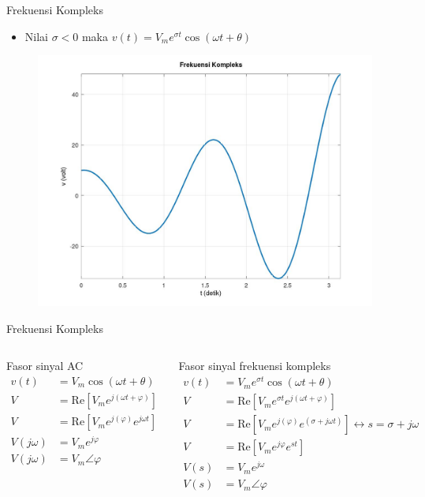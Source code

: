\documentclass[10pt]{beamer}
\begin{document}
\begin{frame}{Frekuensi Kompleks}
    \begin{itemize}
        \item Nilai $\sigma < 0$ maka $v(t) = V_m e^{\sigma t} \cos(\omega t + \theta) $
    \end{itemize}
    \begin{figure}
        \includegraphics[width=0.8\linewidth]{gambar6.jpg}
    \end{figure}
\end{frame}

\begin{frame}{Frekuensi Kompleks}
    \begin{columns}[T,onlytextwidth]
        Fasor sinyal AC
        \begin{align*}
            v(t) &= V_m \cos(\omega t + \theta) \\
            V &= \text{Re} \left[ V_m e^{j(\omega t + \varphi)} \right] \\
            V &= \text{Re} \left[ V_m e^{j(\varphi)} e^{j\omega t} \right] \\
            V(j \omega) &= V_m e^{j \varphi} \\
            V(j\omega) &= V_m \angle \varphi
        \end{align*}

        Fasor sinyal frekuensi kompleks
        \begin{align*}
            v(t) &= V_m e^{\sigma t}\cos(\omega t + \theta) \\
            V &= \text{Re} \left[ V_m e^{\sigma t} e^{j(\omega t + \varphi)} \right] \\
            V &= \text{Re} \left[ V_m e^{j(\varphi)} e^{(\sigma + j\omega t)} \right] \leftrightarrow s = \sigma + j \omega\\
            V &= \text{Re} \left[ V_m e^{j \varphi} e^{st}  \right]\\
            V(s) &= V_m e^{j \omega} \\
            V(s) &= V_m \angle \varphi
        \end{align*}
    \end{columns}    
\end{frame}
\end{document}
